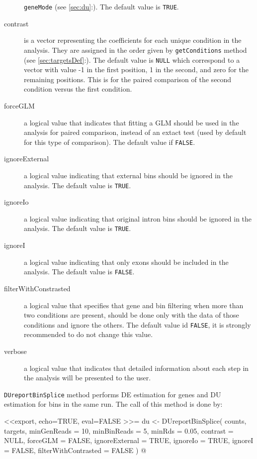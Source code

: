 \documentclass{article}
\newcommand{\secref}[1]{\ref{#1}:\nameref{#1}}
\begin{document}
\begin{description}
  \texttt{geneMode} (see \secref{sec:du}). The default value is \texttt{TRUE}.
  \item[contrast] is a vector representing the coefficients for each unique
  condition in the analysis. They are assigned in the order given by
  \texttt{getConditions} method (see \secref{sec:targetsDef}). The default value
  is \texttt{NULL} which correspond to a vector with value -1 in the first
  position, 1 in the second, and zero for the remaining positions. This is for
  the paired comparison of the second condition versus the first condition.
  \item[forceGLM] a logical value that indicates that fitting a GLM should be
  used in the analysis for paired comparison, instead of an extact test (used
  by default for this type of comparison). The default value if \texttt{FALSE}.
  \item[ignoreExternal] a logical value indicating that external bins should
  be ignored in the analysis. The default value is \texttt{TRUE}.
  \item[ignoreIo] a logical value indicating that original intron bins should
  be ignored in the analysis. The default value is \texttt{TRUE}.
  \item[ignoreI] a logical value indicating that only exons should be included
  in the analysis. The default value is \texttt{FALSE}.
  \item[filterWithConstrasted] a logical value that specifies that gene and
  bin filtering when more than two conditions are present, should be done only
  with the data of those conditions and ignore the others. The default value
  id \texttt{FALSE}, it is strongly recommended to do not change this value.
  \item[verbose] a logical value that indicates that detailed information
  about each step in the analysis will be presented to the user.
  
\end{description}


\texttt{DUreportBinSplice} method performs DE estimation for genes and DU
estimation for bins in the same run. The call of this method is done by:

<<export, echo=TRUE, eval=FALSE >>=
du <- DUreportBinSplice( counts, 
                         targets, 
                         minGenReads = 10, 
                         minBinReads = 5,
                         minRds = 0.05, 
                         contrast = NULL, 
                         forceGLM = FALSE, 
                         ignoreExternal = TRUE, 
                         ignoreIo = TRUE, 
                         ignoreI = FALSE,
                         filterWithContrasted = FALSE )
@
\end{document}
